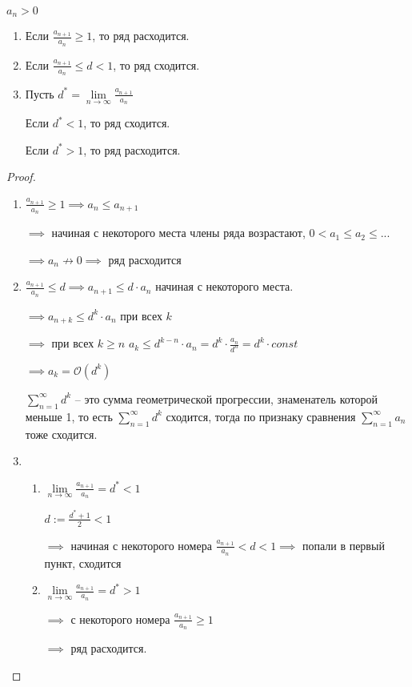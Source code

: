 
\begin{theorem}\slashns
	
	$a_n > 0$
	
	\begin{enumerate}
		\item Если $\frac{a_{n+1}}{a_n} \ge 1$, то ряд расходится.
		\item Если $\frac{a_{n+1}}{a_n} \le d < 1$, то ряд сходится.
		\item Пусть $d^* = \lim\limits_{n \to \infty} \frac{a_{n+1}}{a_n}$
		
		Если $d^* < 1$, то ряд сходится.
		
		Если $d^* > 1$, то ряд расходится.
		
	\end{enumerate}
\end{theorem}

\begin{proof}\slashns
	
	\begin{enumerate}
		\item $\frac{a_{n+1}}{a_n} \ge 1 \implies a_n \le a_{n+1}$

		$ \implies$ начиная с некоторого места члены ряда возрастают, $0 < a_1 \le a_2 \le ...$
		
		$\implies a_n \not\to 0 \implies$  ряд расходится

		\item $\frac{a_{n+1}}{a_n} \le d \implies a_{n+1} \le d \cdot a_{n}$ начиная с некоторого места.

		$\implies a_{n+k} \le d^k \cdot a_n$ при всех $k$

		$\implies$ при всех $k \ge n$ $a_k \le d^{k - n} \cdot a_n = d^k \cdot \frac{a_n}{d^n} = d^k \cdot const$

		$\implies a_k = \mathcal{O}(d^k)$

		$\sum\limits_{n=1}^{\infty}d^k$ -- это сумма геометрической прогрессии, знаменатель которой меньше 1, то есть $\sum\limits_{n=1}^{\infty}d^k$ сходится, тогда по признаку сравнения $\sum\limits_{n=1}^{\infty}a_n$ тоже сходится.
		
		\item 
		\begin{enumerate}
			\item $\lim\limits_{n \to \infty} \frac{a_{n+1}}{a_n} = d^* < 1$
		
			$d:= \frac{d^*+1}{2} < 1$
		
			$\implies$ начиная с некоторого номера $\frac{a_{n+1}}{a_n} < d < 1 \implies$ попали в первый пункт, сходится
		
			\item $\lim\limits_{n \to \infty} \frac{a_{n+1}}{a_n} = d^* > 1$
		
			$\implies$ с некоторого номера $\frac{a_{n+1}}{a_n} \ge 1$
		
			$\implies$ ряд расходится.
		\end{enumerate} 
	\end{enumerate}
\end{proof}

